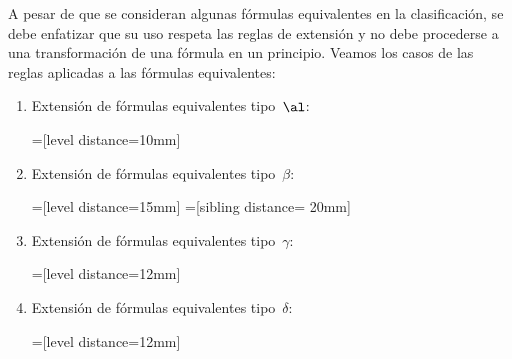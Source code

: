\documentclass[11pt,letterpaper]{article}
\begin{document}
A pesar de que se consideran algunas f\'ormulas equivalentes en la 
clasificaci\'on, se debe enfatizar que su uso respeta las reglas de extensi\'on 
y no debe procederse a una transformaci\'on de una f\'ormula en un principio.
Veamos los casos de las reglas aplicadas a las f\'ormulas equivalentes:
\begin{enumerate}
 \item Extensión de f\'ormulas equivalentes tipo~$\al$: 
 \begin{center}
=[level distance=10mm]
\qquad \qquad 
  
\end{center}
\item Extensión de f\'ormulas equivalentes tipo~$\beta$:
\begin{center}
=[level distance=15mm]
=[sibling distance= 20mm]
 \quad \quad
\quad \qquad
\quad \qquad

     
\end{center}

\item Extensión de f\'ormulas equivalentes tipo~$\gamma$:
\begin{center}
  =[level distance=12mm]
\end{center}

\item Extensión de f\'ormulas equivalentes tipo~$\delta$:
\begin{center}
  =[level distance=12mm]
\end{center}


\end{enumerate}
\end{document}
